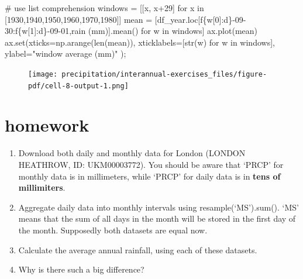 \documentclass[
  letterpaper,
  DIV=11,
  numbers=noendperiod]{scrreprt}
\newenvironment{Shaded}{\begin{snugshade}}{\end{snugshade}}
\newcommand{\BuiltInTok}[1]{\textcolor[rgb]{0.00,0.23,0.31}{#1}}
\newcommand{\CommentTok}[1]{\textcolor[rgb]{0.37,0.37,0.37}{#1}}
\newcommand{\ControlFlowTok}[1]{\textcolor[rgb]{0.00,0.23,0.31}{#1}}
\newcommand{\DecValTok}[1]{\textcolor[rgb]{0.68,0.00,0.00}{#1}}
\newcommand{\KeywordTok}[1]{\textcolor[rgb]{0.00,0.23,0.31}{#1}}
\newcommand{\NormalTok}[1]{\textcolor[rgb]{0.00,0.23,0.31}{#1}}
\newcommand{\OperatorTok}[1]{\textcolor[rgb]{0.37,0.37,0.37}{#1}}
\newcommand{\SpecialCharTok}[1]{\textcolor[rgb]{0.37,0.37,0.37}{#1}}
\newcommand{\SpecialStringTok}[1]{\textcolor[rgb]{0.13,0.47,0.30}{#1}}
\newcommand{\StringTok}[1]{\textcolor[rgb]{0.13,0.47,0.30}{#1}}
\providecommand{\tightlist}{%
  \setlength{\itemsep}{0pt}\setlength{\parskip}{0pt}}\usepackage{longtable,booktabs,array}
\begin{document}
\begin{Shaded}
\begin{Highlighting}[]
\CommentTok{\# use list comprehension}
\NormalTok{windows }\OperatorTok{=}\NormalTok{ [[x, x}\OperatorTok{+}\DecValTok{29}\NormalTok{] }\ControlFlowTok{for}\NormalTok{ x }\KeywordTok{in}\NormalTok{ [}\DecValTok{1930}\NormalTok{,}\DecValTok{1940}\NormalTok{,}\DecValTok{1950}\NormalTok{,}\DecValTok{1960}\NormalTok{,}\DecValTok{1970}\NormalTok{,}\DecValTok{1980}\NormalTok{]]}
\NormalTok{mean }\OperatorTok{=}\NormalTok{ [df\_year.loc[}\SpecialStringTok{f\textquotesingle{}}\SpecialCharTok{\{}\NormalTok{w[}\DecValTok{0}\NormalTok{]}\SpecialCharTok{:d\}}\SpecialStringTok{{-}09{-}30\textquotesingle{}}\NormalTok{:}\SpecialStringTok{f\textquotesingle{}}\SpecialCharTok{\{}\NormalTok{w[}\DecValTok{1}\NormalTok{]}\SpecialCharTok{:d\}}\SpecialStringTok{{-}09{-}01\textquotesingle{}}\NormalTok{,}\StringTok{\textquotesingle{}rain (mm)\textquotesingle{}}\NormalTok{].mean() }\ControlFlowTok{for}\NormalTok{ w }\KeywordTok{in}\NormalTok{ windows]}
\NormalTok{ax.plot(mean)}
\NormalTok{ax.}\BuiltInTok{set}\NormalTok{(xticks}\OperatorTok{=}\NormalTok{np.arange(}\BuiltInTok{len}\NormalTok{(mean)),}
\NormalTok{       xticklabels}\OperatorTok{=}\NormalTok{[}\BuiltInTok{str}\NormalTok{(w) }\ControlFlowTok{for}\NormalTok{ w }\KeywordTok{in}\NormalTok{ windows],}
\NormalTok{       ylabel}\OperatorTok{=}\StringTok{"window average (mm)"}
\NormalTok{      )}\OperatorTok{;}
\end{Highlighting}
\end{Shaded}

\begin{figure}[H]

{\centering \texttt{[image: precipitation/interannual-exercises\_files/figure-pdf/cell-8-output-1.png]}

}

\end{figure}

\hypertarget{homework-1}{%
\section{homework}\label{homework-1}}

\begin{enumerate}
\def\labelenumi{\arabic{enumi}.}
\tightlist
\item
  Download both daily and monthly data for London (LONDON HEATHROW, ID:
  UKM00003772). You should be aware that `PRCP' for monthly data is in
  millimeters, while `PRCP' for daily data is in \textbf{tens of
  millimiters}.
\item
  Aggregate daily data into monthly intervals using
  resample(`MS').sum(). `MS' means that the sum of all days in the month
  will be stored in the first day of the month. Supposedly both datasets
  are equal now.
\item
  Calculate the average annual rainfall, using each of these datasets.
\item
  Why is there such a big difference?
\end{enumerate}
\end{document}

